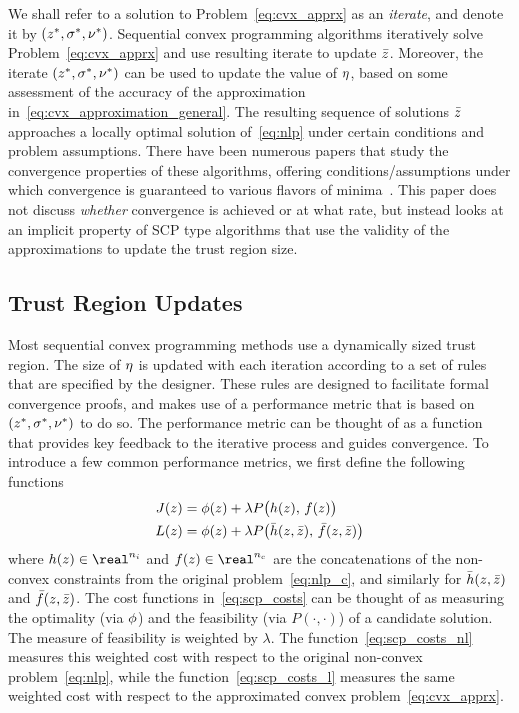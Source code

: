 \documentclass[letterpaper, 10 pt, conference]{ieeeconf}
\begin{document}
We shall refer to a solution to Problem~\eqref{eq:cvx_apprx} as an \textit{iterate}, and denote it by $(z^*,\sigma^*,\nu^*)$. Sequential convex programming algorithms iteratively solve Problem~\eqref{eq:cvx_apprx} and use resulting iterate to update $\bar{z}$. Moreover, the iterate $(z^*,\sigma^*,\nu^*)$ can be used to update the value of $\eta$, based on some assessment of the accuracy of the approximation in~\eqref{eq:cvx_approximation_general}. The resulting sequence of solutions $\bar{z}$ approaches a locally optimal solution of~\eqref{eq:nlp} under certain conditions and problem assumptions. There have been numerous papers that study the convergence properties of these algorithms, offering conditions/assumptions under which convergence is guaranteed to various flavors of minima~. This paper does not discuss \textit{whether} convergence is achieved or at what rate, but instead looks at an implicit property of SCP type algorithms that use the validity of the approximations to update the trust region size.

\subsection{Trust Region Updates}\label{subsec:tr_updates}

Most sequential convex programming methods use a dynamically sized trust region. The size of $\eta$ is updated with each iteration according to a set of rules that are specified by the designer. These rules are designed to facilitate formal convergence proofs, and makes use of a performance metric that is based on $(z^*,\sigma^*,\nu^*)$ to do so. The performance metric can be thought of as a function that provides key feedback to the iterative process and guides convergence. To introduce a few common performance metrics, we first define the following functions
\begin{subequations}\label{eq:scp_costs}
\begin{align}
J(z) &= \phi(z) + \lambda P\big( h(z),\,f(z) \big) \label{eq:scp_costs_nl}\\
L(z) &= \phi(z) + \lambda P\big( \bar{h}(z,\bar{z}),\,\bar{f}(z,\bar{z}) \big) \label{eq:scp_costs_l}
\end{align}
\end{subequations}
where $\fni(\z) \in \real^{n_i}$ and $\fne(\z)\in\real^{n_e}$ are the concatenations of the non-convex constraints from the original problem~\eqref{eq:nlp_c}, and similarly for $\bar{h}(z,\bar{z})$ and $\bar{f}(z,\bar{z})$. The cost functions in~\eqref{eq:scp_costs} can be thought of as measuring the optimality (via $\phi$) and the feasibility (via $P(\cdot,\cdot)$) of a candidate solution. The measure of feasibility is weighted by $\lambda$. The function~\eqref{eq:scp_costs_nl} measures this weighted cost with respect to the original non-convex problem~\eqref{eq:nlp}, while the function~\eqref{eq:scp_costs_l} measures the same weighted cost with respect to the approximated convex problem~\eqref{eq:cvx_apprx}. 
\end{document}
